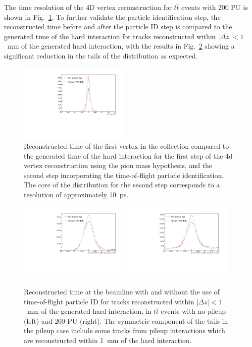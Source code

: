 The time resolution of the 4D vertex reconstruction for $t\bar t$ events with 200 PU is shown in Fig.~\ref{fig:vtxdtgen}.  To further validate the particle identification step, the reconstructed time before and after the particle ID step is compared to the generated time of the hard interaction for tracks reconstructed within $|\Delta z|<1$~mm of the generated hard interaction, with the results in Fig.~\ref{fig:pidtres} showing a significant reduction in the tails of the distribution as expected.

\begin{figure}[!hbtp]
\centering
\includegraphics[width=0.48\textwidth]{fig/performance/4dvtx/ttbarpu200/dtvtxgen.pdf}
\caption{Reconstructed time of the first vertex in the collection compared to the generated time of the hard interaction for the first step of the 4d vertex reconstruction using the pion mass hypothesis, and the second step incorporating the time-of-flight particle identification.  The core of the distribution for the second step corresponds to a resolution of approximately 10~ps.}
\label{fig:vtxdtgen}
\end{figure}

\begin{figure}[!hbtp]
\centering
\includegraphics[width=0.48\textwidth]{fig/performance/4dvtx/ttbarnopu/dttrkgen.pdf}
\includegraphics[width=0.48\textwidth]{fig/performance/4dvtx/ttbarpu200/dttrkgen.pdf}
\caption{Reconstructed time at the beamline with and without the use of time-of-flight particle ID for tracks reconstructed within $|\Delta z|<1$~mm of the generated hard interaction, in $t\bar t$ events with no pileup (left) and 200 PU (right).  The symmetric component of the tails in the pileup case include some tracks from pileup interactions which are reconstructed within 1~mm of the hard interaction.}
\label{fig:pidtres}
\end{figure}

